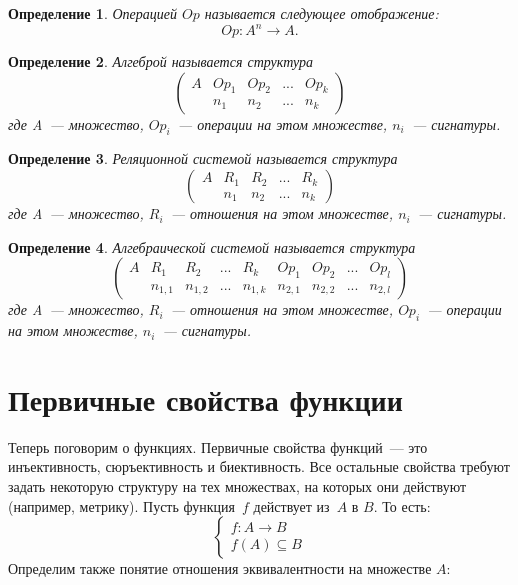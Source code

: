 \documentclass[a4paper, 12pt]{report}
\newtheorem{definition}{Определение}[chapter]
\begin{document}
\begin{definition}
Операцией $Op$ называется следующее отображение:
\[
Op: A^n \rightarrow A.
\]
\end{definition}

\begin{definition}
Алгеброй называется структура
\[
\begin{pmatrix}
A & Op_1 & Op_2 & ... & Op_k \\
    & n_1 & n_2 & ... & n_k
\end{pmatrix}
\]
где A~--- множество, $Op_i$~--- операции на этом множестве, $n_i$~--- сигнатуры.
\end{definition}

\begin{definition}
Реляционной системой называется структура
\[
\begin{pmatrix}
A & R_1 & R_2 & ... & R_k \\
  & n_1 & n_2 & ... & n_k
\end{pmatrix}
\]
где A~--- множество, $R_i$~--- отношения на этом множестве, $n_i$~--- сигнатуры.
\end{definition}

\begin{definition}
Алгебраической системой называется структура
\[
\begin{pmatrix}
A & R_1 & R_2 & ... & R_k & Op_1 & Op_2 & ... & Op_l \\
  & n_{1,1} & n_{1,2} & ... & n_{1,k} & n_{2,1} & n_{2,2} & ... & n_{2,l}
\end{pmatrix}
\]
где A~--- множество, $R_i$~--- отношения на этом множестве, $Op_i$~--- операции на этом множестве, $n_i$~--- сигнатуры.
\end{definition}

\section{Первичные свойства функции}
Теперь поговорим о функциях. Первичные свойства функций~--- это инъективность, сюръективность и биективность. Все остальные свойства требуют задать некоторую структуру на тех множествах, на которых они действуют (например, метрику).
Пусть функция~$f$ действует из~$A$ в $B$. То есть:
\[
\left\{
  \begin{array}{ll}
    f: A\rightarrow B\\
    f(A) \subseteq B
  \end{array}
\right.
\]
Определим также понятие отношения эквивалентности на множестве $A$:
\end{document}
